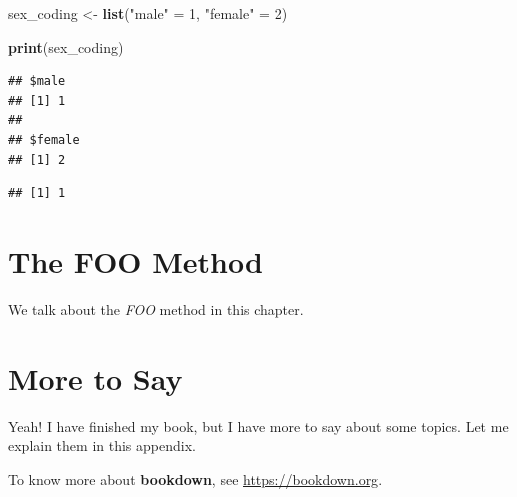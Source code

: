\documentclass[
]{krantz}
\makeatletter
\newenvironment{Shaded}{\begin{snugshade}}{\end{snugshade}}
\newcommand{\DecValTok}[1]{\textcolor[rgb]{0.06,0.06,0.06}{#1}}
\newcommand{\KeywordTok}[1]{\textcolor[rgb]{0.27,0.27,0.27}{\textbf{#1}}}
\newcommand{\NormalTok}[1]{#1}
\newcommand{\OperatorTok}[1]{\textcolor[rgb]{0.43,0.43,0.43}{\textbf{#1}}}
\newcommand{\StringTok}[1]{\textcolor[rgb]{0.5,0.5,0.5}{#1}}
\newenvironment{kframe}{%
\medskip{}
\setlength{\fboxsep}{.8em}
 \def\at@end@of@kframe{}%
 \ifinner\ifhmode%
  \def\at@end@of@kframe{\end{minipage}}%
  \begin{minipage}{\columnwidth}%
 \fi\fi%
 \def\FrameCommand##1{\hskip\@totalleftmargin \hskip-\fboxsep
 \colorbox{shadecolor}{##1}\hskip-\fboxsep
     \hskip-\linewidth \hskip-\@totalleftmargin \hskip\columnwidth}%
 \MakeFramed {\advance\hsize-\width
   \@totalleftmargin\z@ \linewidth\hsize
   \@setminipage}}%
 {\par\unskip\endMakeFramed%
 \at@end@of@kframe}
\renewenvironment{Shaded}{\begin{kframe}}{\end{kframe}}
\makeatother
\begin{document}
\begin{Shaded}
\begin{Highlighting}[]
\NormalTok{sex_coding <-}\StringTok{ }\KeywordTok{list}\NormalTok{(}\StringTok{"male"}\NormalTok{ =}\StringTok{ }\DecValTok{1}\NormalTok{,}
                   \StringTok{"female"}\NormalTok{ =}\StringTok{ }\DecValTok{2}\NormalTok{)}

\KeywordTok{print}\NormalTok{(sex_coding)}
\end{Highlighting}
\end{Shaded}

\begin{verbatim}
## $male
## [1] 1
## 
## $female
## [1] 2
\end{verbatim}

\begin{Shaded}
\end{Shaded}

\begin{verbatim}
## [1] 1
\end{verbatim}

\hypertarget{the-foo-method}{%
\chapter{The FOO Method}\label{the-foo-method}}

We talk about the \emph{FOO} method in this chapter.

\cleardoublepage

\hypertarget{appendix-appendix}{%
\appendix {}}


\hypertarget{more-to-say}{%
\chapter{More to Say}\label{more-to-say}}

Yeah! I have finished my book, but I have more to say about some topics. Let me explain them in this appendix.

To know more about \textbf{bookdown}, see \url{https://bookdown.org}.

  

\backmatter
\printindex
\end{document}
